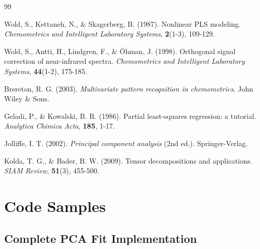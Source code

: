 \documentclass[12pt,a4paper]{article}
\begin{document}
\newpage

\begin{thebibliography}{99}

Wold, S., Kettaneh, N., \& Skagerberg, B. (1987).
Nonlinear PLS modeling.
\textit{Chemometrics and Intelligent Laboratory Systems}, \textbf{2}(1-3), 109-129.

Wold, S., Antti, H., Lindgren, F., \& Öhman, J. (1998).
Orthogonal signal correction of near-infrared spectra.
\textit{Chemometrics and Intelligent Laboratory Systems}, \textbf{44}(1-2), 175-185.

Brereton, R. G. (2003).
\textit{Multivariate pattern recognition in chemometrics}.
John Wiley \& Sons.

Geladi, P., \& Kowalski, B. R. (1986).
Partial least-squares regression: a tutorial.
\textit{Analytica Chimica Acta}, \textbf{185}, 1-17.

Jolliffe, I. T. (2002).
\textit{Principal component analysis} (2nd ed.).
Springer-Verlag.

Kolda, T. G., \& Bader, B. W. (2009).
Tensor decompositions and applications.
\textit{SIAM Review}, \textbf{51}(3), 455-500.

\end{thebibliography}

\newpage

\appendix

\section{Code Samples}

\subsection{Complete PCA Fit Implementation}
\end{document}
